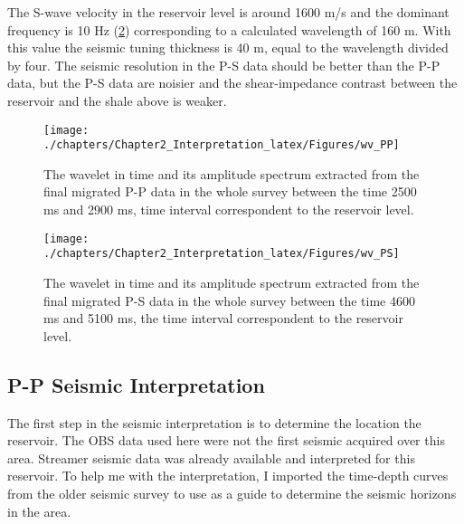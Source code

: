  
The S-wave velocity in the reservoir level is around 1600 m/s and the dominant frequency is 10 Hz (\ref{fig:wv_PS}) corresponding to a calculated wavelength of 160 m. With this value the seismic tuning thickness is 40 m, equal to the wavelength divided by four. The seismic resolution in the P-S data should be better than the P-P data, but the P-S data are noisier and the shear-impedance contrast between the reservoir and the shale above is weaker. 

\begin{figure}[hbtp]
	\begin{center}
	\texttt{[image: ./chapters/Chapter2\_Interpretation\_latex/Figures/wv\_PP]}
			\caption[The average wavelet in time and its amplitude spectrum extracted from the final migrated P-P data in the whole survey between the time 2500 ms and 2900 ms.]{The wavelet in time and its amplitude spectrum extracted from the final migrated P-P data in the whole survey between the time 2500 ms and 2900 ms, time interval correspondent to the reservoir level. }
			\label{fig:wv_PP}
		\end{center}
	\end{figure}
	
	
\begin{figure}[hbtp]
	\begin{center}
	\texttt{[image: ./chapters/Chapter2\_Interpretation\_latex/Figures/wv\_PS]}
			\caption[The average wavelet in time and its amplitude spectrum extracted from the P-S data using whole P-S migrated volume between the time 4600 ms and 5100 ms.]{The wavelet in time and its amplitude spectrum extracted from the final migrated P-S data in the whole survey between the time 4600 ms and 5100 ms, the time interval correspondent to the reservoir level. }
			\label{fig:wv_PS}
		\end{center}
	\end{figure}



\subsection{P-P Seismic Interpretation}

The first step in the seismic interpretation is to determine the location the reservoir. The OBS data used here were not the first seismic acquired over this area. Streamer seismic data was already available and interpreted for this reservoir. To help me with the interpretation, I imported the time-depth curves from the older seismic survey to use as a guide to determine the seismic horizons in the area. 

